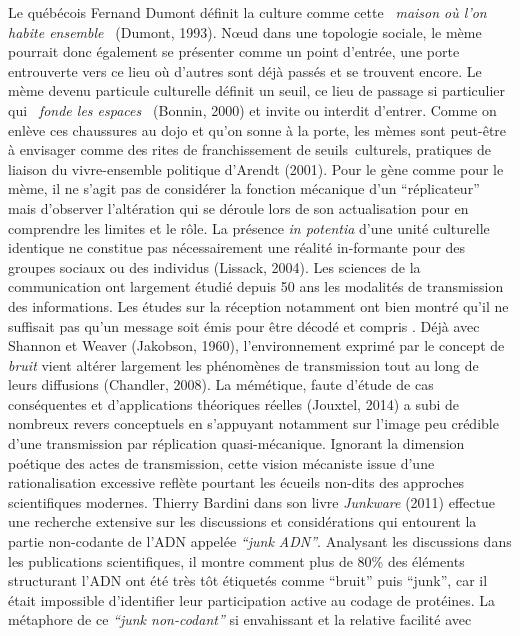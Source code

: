 Le qu\'eb\'ecois Fernand Dumont d\'efinit la culture comme cette \textit{{\guillemotleft}~maison o\`u l{\textquoteright}on habite ensemble~{\guillemotright} }(Dumont, 1993). N{\oe}ud dans une topologie sociale, le m\`eme pourrait donc \'egalement se pr\'esenter comme un point d{\textquoteright}entr\'ee, une porte entrouverte vers ce lieu o\`u d{\textquoteright}autres sont d\'ej\`a pass\'es et se trouvent encore. Le m\`eme devenu particule culturelle d\'efinit un seuil, ce lieu de passage si particulier qui \textit{{\guillemotleft}~fonde les espaces~{\guillemotright}} (Bonnin, 2000) et invite ou interdit d{\textquoteright}entrer. Comme on enl\`eve ces chaussures au dojo et qu{\textquoteright}on sonne \`a la porte, les m\`emes sont peut-\^etre \`a envisager comme des rites de franchissement de seuils~culturels, pratiques de liaison du vivre-ensemble politique d{\textquoteright}Arendt (2001). Pour le g\`ene comme pour le m\`eme, il ne s{\textquoteright}agit pas de consid\'erer la fonction m\'ecanique d{\textquoteright}un {\textquotedblleft}r\'eplicateur{\textquotedblright} mais d{\textquoteright}observer l{\textquoteright}alt\'eration qui se d\'eroule lors de son actualisation pour en comprendre les limites et le r\^ole. La pr\'esence \textit{in potentia }d{\textquoteright}une unit\'e culturelle identique ne constitue pas n\'ecessairement une r\'ealit\'e in-formante pour des groupes sociaux ou des individus (Lissack, 2004). Les sciences de la communication ont largement \'etudi\'e depuis 50 ans les modalit\'es de transmission des informations. Les \'etudes sur la r\'eception notamment ont bien montr\'e qu{\textquoteright}il ne suffisait pas qu{\textquoteright}un message soit \'emis pour \^etre d\'ecod\'e et compris \cite{Katz1989}. D\'ej\`a avec Shannon et Weaver (Jakobson, 1960), l{\textquoteright}environnement exprim\'e par le concept de\textit{ bruit }vient alt\'erer largement les ph\'enom\`enes de transmission tout au long de leurs diffusions (Chandler, 2008). La m\'em\'etique, faute d{\textquoteright}\'etude de cas cons\'equentes et d{\textquoteright}applications th\'eoriques r\'eelles (Jouxtel, 2014) a subi de nombreux revers conceptuels en s{\textquoteright}appuyant notamment sur l{\textquoteright}image peu cr\'edible d{\textquoteright}une transmission par r\'eplication quasi-m\'ecanique. Ignorant la dimension po\'etique des actes de transmission, cette vision m\'ecaniste issue d{\textquoteright}une rationalisation excessive refl\`ete pourtant les \'ecueils non-dits des approches scientifiques modernes. Thierry Bardini dans son livre \textit{Junkware }(2011) effectue une recherche extensive sur les discussions et consid\'erations qui entourent la partie non-codante de l{\textquoteright}ADN appel\'ee \textit{{\textquotedblleft}junk ADN{\textquotedblright}}. Analysant les discussions dans les publications scientifiques, il montre comment plus de 80\% des \'el\'ements structurant l{\textquoteright}ADN ont \'et\'e tr\`es t\^ot \'etiquet\'es comme {\textquotedblleft}bruit{\textquotedblright} puis {\textquotedblleft}junk{\textquotedblright}, car il \'etait impossible d{\textquoteright}identifier leur participation active au codage de prot\'eines. La m\'etaphore de ce \textit{{\textquotedblleft}junk non-codant{\textquotedblright} }si envahissant et la relative facilit\'e avec 